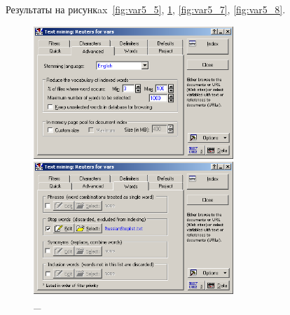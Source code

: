 Результаты на рисункax~\ref{fig:var5_5}, \ref{fig:var5_6}, \ref{fig:var5_7}, \ref{fig:var5_8}.

\begin{figure}[!h]
  \centering

  \begin{minipage}{0.49\textwidth}
    \centering

    \includegraphics[height=5cm]
    {inc/var5/5.PNG}

    \caption{\_}

    \label{fig:var5_5}
  \end{minipage}
  \begin{minipage}{0.49\textwidth}
    \centering

    \includegraphics[height=5cm]
    {inc/var5/6.PNG}

    \caption{\_}

    \label{fig:var5_6}
  \end{minipage}
\end{figure}

